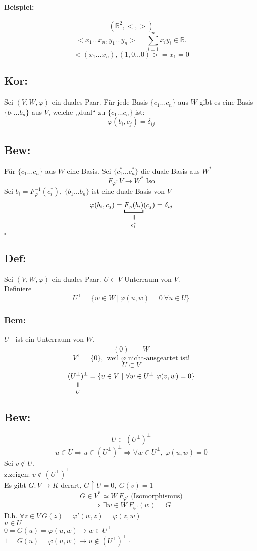 \documentclass[titlepage,12pt,a4paper,ngerman]{report}
\newenvironment{bew}[1]{\subsection{Bew: #1}}{\hfill$\square$}
\newcommand{\Bew}[2]{\begin{bew}{#1}#2\end{bew}}
\newcommand{\verteq}{\rotatebox{90}{$\,=$}}
\newcommand{\equalto}[2]{\underset{\scriptstyle\overset{\mkern4mu\verteq}{#2}}{#1}}
\newcommand{\tx}[1]{\textrm{#1}}
\begin{document}
\paragraph{Beispiel:}
$$(\mathbb R^2, <, > )$$
$$<x_1 \dots x_n, y_1 \dots y_n> = \sum_{i=1}^n x_i y_i \in \mathbb R.$$
$$<(x_1 \dots x_n), (1, 0 \dots 0)> = x_1 = 0$$

\subsection{Kor:}
Sei $(V,W,\varphi)$ ein duales Paar. Für jede Basis $\{c_1 \dots c_n\}$ aus $W$ gibt es eine Basis $\{b_1 \dots b_n\}$ aus $V$, welche ,,dual`` zu $\{c_1 \dots c_n\}$ ist:
$$\varphi(b_i, c_j) = \delta_{ij}$$

\Bew{}{
	Für $\{c_1 \dots c_n\}$ aus $W$ eine Basis.
	Sei $\{c_1^* \dots c_n^*\}$ die duale Basis aus $W^*$
	$$F_\varphi: V \to W^* \tx{ Iso}$$
	Sei $b_i = F_\varphi^{-1}(c_i^*),\ \{b_1 \dots b_n\}$ ist eine duale Basis von $V$
	$$\varphi(b_i, c_j) = \equalto{\underbracket{F_\varphi(b_i)}}{c_i^*}(c_j) = \delta_{ij}$$
}

\subsection{Def:}
Sei $(V,W,\varphi)$ ein duales Paar. $U \subset V$ Unterraum von $V$.\\
Definiere $$U^\perp = \{w \in W \ |\  \varphi (u,w) = 0\ \forall u \in U \}$$
\subsubsection*{Bem:}
$U^\perp$ ist ein Unterraum von $W$.
$$(0)^\perp = W$$
$$V^\perp = \{0\}, \tx{ weil $\varphi$ nicht-ausgeartet ist!}$$
$$U \subset V$$
$$\equalto{(U^\perp)^\perp}{U} = \{v \in V \ | \  \forall w \in U^\perp\ \varphi(v,w) = 0 \}$$
\Bew{}{
	$$U\subset (U^\perp)^\perp$$
	$$u \in U \Rightarrow  u \in (U^\perp)^\perp \Rightarrow \forall w \in U^\perp,\ \varphi(u,w) = 0$$
	Sei $v \notin U.$\\
	z.zeigen: $v \notin (U^\perp)^\perp$\\
	Es gibt $G: V \to K$ derart, $G\upharpoonright U = 0,\ G(v) = 1$
	$$G \in V^* \simeq W\ F_{\varphi'} \tx{ (Isomorphismus)}$$
	$$\Rightarrow \exists w \in W\ F_{\varphi'}(w) = G$$
	D.h. $\forall z \in V\ G (z) = \varphi' (w,z) = \varphi(z,w)$\\
	$u \in U$\\
	$ 0 = G(u) = \varphi(u,w) \rightarrow w \in U^\perp $\\
	$ 1 = G(u) = \varphi(u,w) \rightarrow u \notin (U^\perp)^\perp $
}
\end{document}
